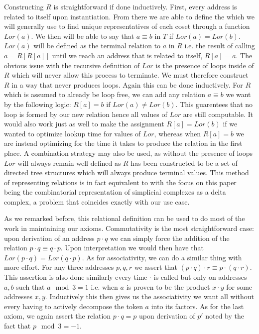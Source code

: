 \documentclass[12pt]{amsart}
\begin{document}
Constructing $R$ is straightforward if done inductively. First, every address is related to itself upon instantiation. From there we are able to define the  which we will generally use to find unique representatives of each coset through a function $Lor(a)$. We then will be able to say that $a\equiv b$ in $T$ if $Lor(a) = Lor(b)$. $Lor(a)$ will be defined as the terminal relation to $a$ in $R$ i.e. the result of calling $a = R[R[a]]$ until we reach an address that is related to itself, $R[a] = a$. The obvious issue with the recursive definition of $Lor$ is the presence of loops inside of $R$ which will never allow this process to terminate. We must therefore construct $R$ in a way that never produces loops. Again this can be done inductively. For $R$ which is assumed to already be loop free, we can add any relation $a\equiv b$ we want by the following logic: $R[a] = b$ if $Lor(a)\neq Lor(b)$. This guarentees that no loop is formed by our new relation hence all values of $Lor$ are still computable. It would also work just as well to make the assignment $R[a] = Lor(b)$ if we wanted to optimize lookup time for values of $Lor$, whereas when $R[a] = b$ we are instead optimizing for the time it takes to produce the relation in the first place. A combination strategy may also be used, as without the presence of loops $Lor$ will always remain well defined as $R$ has been constructed to be a set of directed tree structures which will always produce terminal values. This method of representing relations is in fact equivalent to \cite{Renzullo} with the focus on this paper being the combinatorial representation of simplicial complexes as a delta complex, a problem that coincides exactly with our use case.

As we remarked before, this relational definition can be used to do most of the work in maintaining our axioms. Commutativity is the most straightforward case: upon derivation of an address $p\cdot q$ we can simply force the addition of the relation $p\cdot q \equiv  q\cdot p$. Upon interpretation we would then have that $Lor(p\cdot q) = Lor(q\cdot p)$. As for associativity, we can do a similar thing with more effort. For any three addresses $p,q,r$ we assert that $(p\cdot q) \cdot r \equiv  p\cdot (q \cdot r)$. This assertion is also done similarly every time $\cdot$ is called but only on addresses $a,b$ such that $a\mod 3 = 1$ i.e. when $a$ is proven to be the product $x\cdot y$ for some addresses $x,y$. Inductively this then gives us the associativity we want all without every having to actively decompose the token $a$ into its factors. As for the last axiom, we again assert the relation $p\cdot q = p$ upon derivation of $p'$ noted by the fact that $p\mod 3 = -1$.
\end{document}
